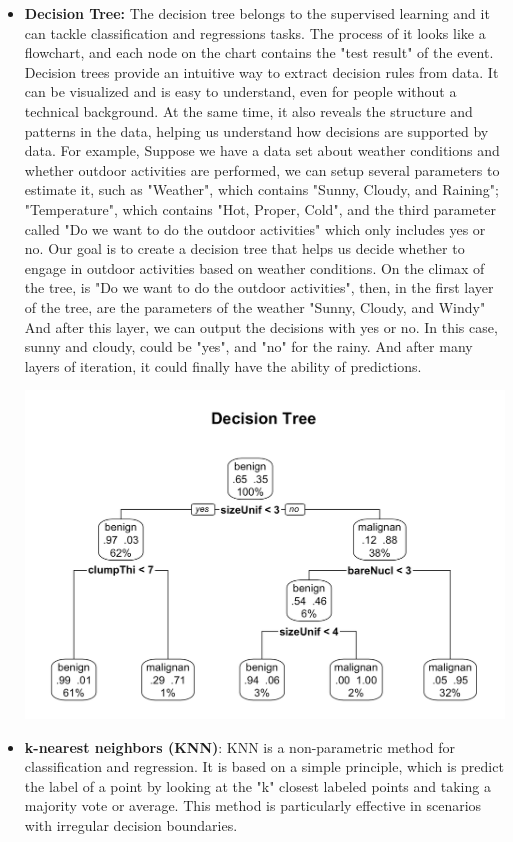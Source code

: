\documentclass[12pt]{article}
\begin{document}
\begin{itemize}
    \item\textbf{Decision Tree: }The decision tree belongs to the supervised learning and it can tackle classification and regressions tasks. The process of it looks like a flowchart, and each node on the chart contains the "test result" of the event. Decision trees provide an intuitive way to extract decision rules from data. It can be visualized and is easy to understand, even for people without a technical background. At the same time, it also reveals the structure and patterns in the data, helping us understand how decisions are supported by data. For example, Suppose we have a data set about weather conditions and whether outdoor activities are performed, we can setup several parameters to estimate it, such as "Weather", which contains "Sunny, Cloudy, and Raining"; "Temperature", which contains "Hot, Proper, Cold", and the third parameter called "Do we want to do the outdoor activities" which only includes yes or no. Our goal is to create a decision tree that helps us decide whether to engage in outdoor activities based on weather conditions. On the climax of the tree, is "Do we want to do the outdoor activities", then, in the first layer of the tree, are the parameters of the weather "Sunny, Cloudy, and Windy" And after this layer, we can output the decisions with yes or no. In this case, sunny and cloudy, could be "yes", and "no" for the rainy. And after many layers of iteration, it could finally have the ability of predictions.

    \includegraphics[width = 1.0\textwidth]{Decision Trees.png}
    
    \item \textbf{k-nearest neighbors (KNN)}: KNN is a non-parametric method for classification and regression. It is based on a simple principle, which is predict the label of a point by looking at the "k" closest labeled points and taking a majority vote or average. This method is particularly effective in scenarios with irregular decision boundaries.


\end{itemize}
\end{document}
